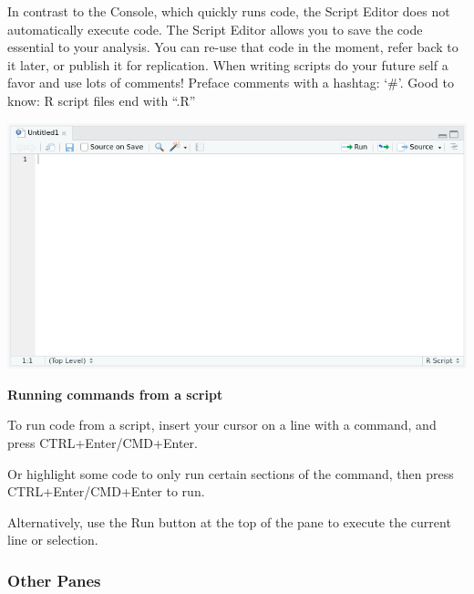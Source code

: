 \documentclass[]{article}
\begin{document}
In contrast to the Console, which quickly runs code, the Script Editor
does not automatically execute code. The Script Editor allows you to
save the code essential to your analysis. You can re-use that code in
the moment, refer back to it later, or publish it for replication. When
writing scripts do your future self a favor and use lots of comments!
Preface comments with a hashtag: `\#'. Good to know: R script files end
with ``.R''

\begin{center}\includegraphics[width=0.9\linewidth]{images/script-editor} \end{center}

\textbf{Running commands from a script}

To run code from a script, insert your cursor on a line with a command,
and press CTRL+Enter/CMD+Enter.

Or highlight some code to only run certain sections of the command, then
press CTRL+Enter/CMD+Enter to run.

Alternatively, use the Run button at the top of the pane to execute the
current line or selection.

\hypertarget{other-panes}{%
\subsubsection{Other Panes}\label{other-panes}}
\end{document}
